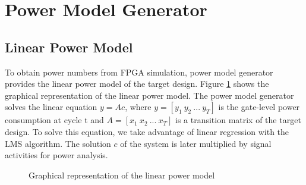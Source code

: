 \section{Power Model Generator}
\label{sec:main}
\subsection{Linear Power Model}

To obtain power numbers from FPGA simulation, power model generator provides the linear power model of the target design.
Figure \ref{fig:model} shows the graphical representation of the linear power model.
The power model generator solves the linear equation $y = Ac$, 
where $y = [y_1 \ y_2 \ ... \ y_T]$ is the gate-level power consumption at cycle t
and $A = [x_1 \ x_2 \ ... \ x_T]$ is a transition matrix of the target design.
To solve this equation, we take advantage of linear regression with the LMS algorithm.
The solution $c$ of the system is later multiplied by signal activities for power analysis.

\begin{figure}
  \centering
  \caption{Graphical representation of the linear power model}
  \label{fig:model}
\end{figure}

